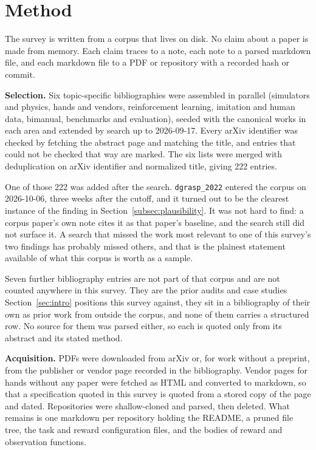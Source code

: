 \section{Method}
\label{app:method}

The survey is written from a corpus that lives on disk. No claim about a paper is made from
memory. Each claim traces to a note, each note to a parsed markdown file, and each markdown file
to a PDF or repository with a recorded hash or commit.

\textbf{Selection.}
Six topic-specific bibliographies were assembled in parallel (simulators and physics, hands and
vendors, reinforcement learning, imitation and human data, bimanual, benchmarks and evaluation),
seeded with the canonical works in each area and extended by search up to 2026-09-17. Every
arXiv identifier was checked by fetching the abstract page and matching the title, and entries
that could not be checked that way are marked. The six lists were merged with deduplication on arXiv
identifier and normalized title, giving 222 entries.

One of those 222 was added after the search. \texttt{dgrasp\_2022} entered the corpus on
2026-10-06, three weeks after the cutoff, and it turned out to be the clearest instance of the
finding in Section~\ref{subsec:plausibility}. It was not hard to find: a corpus paper's own note
cites it as that paper's baseline, and the search still did not surface it. A search that missed
the work most relevant to one of this survey's two findings has probably missed others, and that is
the plainest statement available of what this corpus is worth as a sample.

Seven further bibliography entries are not part of that corpus and are not counted anywhere in
this survey. They are the prior audits and case studies Section~\ref{sec:intro} positions this
survey against, they sit in a bibliography of their own as prior work from outside the corpus, and
none of them carries a structured row. No source for them was parsed either, so each is quoted
only from its abstract and its stated method.

\textbf{Acquisition.}
PDFs were downloaded from arXiv or, for work without a preprint, from the publisher or vendor
page recorded in the bibliography. Vendor pages for hands without any paper were fetched as HTML
and converted to markdown, so that a specification quoted in this survey is quoted from a stored
copy of the page and dated. Repositories were shallow-cloned and parsed, then deleted. What
remains is one markdown per repository holding the README, a pruned file tree, the task and
reward configuration files, and the bodies of reward and observation functions.

